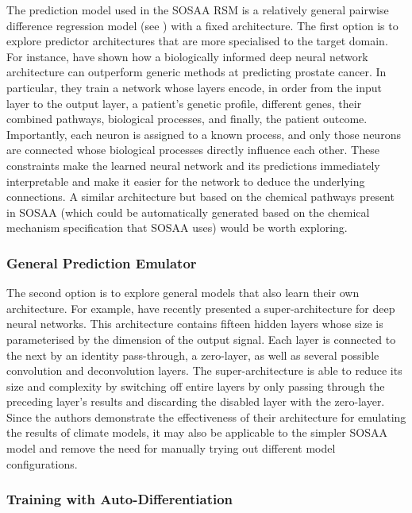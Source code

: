 The prediction model used in the SOSAA RSM is a relatively general pairwise difference regression model (see ) with a fixed architecture. The first option is to explore predictor architectures that are more specialised to the target domain. For instance, \textcite{biological-dnn-2021} have shown how a biologically informed deep neural network architecture can outperform generic methods at predicting prostate cancer. In particular, they train a network whose layers encode, in order from the input layer to the output layer, a patient's genetic profile, different genes, their combined pathways, biological processes, and finally, the patient outcome. Importantly, each neuron is assigned to a known process, and only those neurons are connected whose biological processes directly influence each other. These constraints make the learned neural network and its predictions immediately interpretable and make it easier for the network to deduce the underlying connections. A similar architecture but based on the chemical pathways present in SOSAA (which could be automatically generated based on the chemical mechanism specification that SOSAA uses) would be worth exploring.

\subsubsection{General Prediction Emulator}

The second option is to explore general models that also learn their own architecture. For example, \cite{neural-architecture-search-2021} have recently presented a super-architecture for deep neural networks. This architecture contains fifteen hidden layers whose size is parameterised by the dimension of the output signal. Each layer is connected to the next by an identity pass-through, a zero-layer, as well as several possible convolution and deconvolution layers. The super-architecture is able to reduce its size and complexity by switching off entire layers by only passing through the preceding layer's results and discarding the disabled layer with the zero-layer. Since the authors demonstrate the effectiveness of their architecture for emulating the results of climate models, it may also be applicable to the simpler SOSAA model and remove the need for manually trying out different model configurations.

\subsubsection{Training with Auto-Differentiation}

